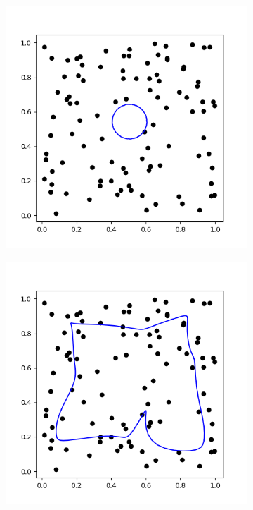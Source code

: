 \documentclass{article}
\begin{document}
\begin{figure}[h]
	\centering
	\begin{subfigure}[t]{0.24\linewidth}
		\centering
		\includegraphics[width = 1.0\linewidth, trim={20 20 30 30}, clip=true]{figures/optimum_1.png}
		\label{fig:sim1}	
	\end{subfigure}%
	\begin{subfigure}[t]{0.24\linewidth}
		\centering
		\includegraphics[width = 1.0\linewidth, trim={20 20 30 30}, clip=true]{figures/int/optimum_K6_011.png}

\end{subfigure}
\end{figure}
\end{document}
